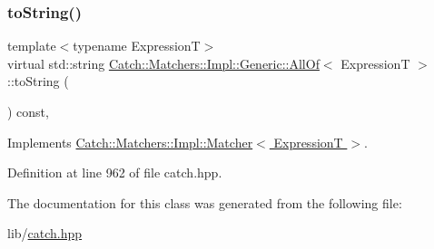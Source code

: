 \subsubsection{\texorpdfstring{to\+String()}{toString()}}
{\footnotesize\ttfamily template$<$typename ExpressionT$>$ \\
virtual std\+::string \hyperlink{class_catch_1_1_matchers_1_1_impl_1_1_generic_1_1_all_of}{Catch\+::\+Matchers\+::\+Impl\+::\+Generic\+::\+All\+Of}$<$ ExpressionT $>$\+::to\+String (\begin{DoxyParamCaption}{ }\end{DoxyParamCaption}) const\hspace{0.3cm}{\ttfamily [inline]}, {\ttfamily [virtual]}}



Implements \hyperlink{struct_catch_1_1_matchers_1_1_impl_1_1_matcher_a091bcc37e589967d7e10fc7790d820e2}{Catch\+::\+Matchers\+::\+Impl\+::\+Matcher$<$ Expression\+T $>$}.



Definition at line 962 of file catch.\+hpp.



The documentation for this class was generated from the following file\+:\begin{DoxyCompactItemize}
\item 
lib/\hyperlink{catch_8hpp}{catch.\+hpp}\end{DoxyCompactItemize}
